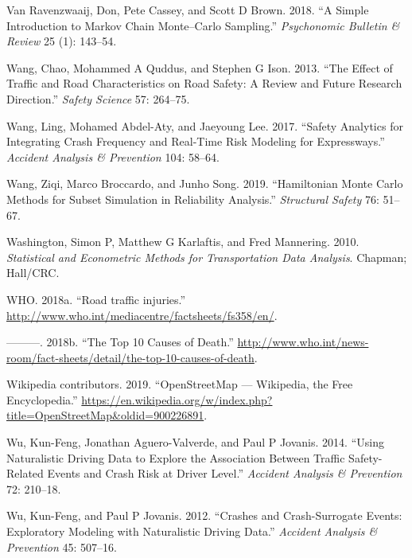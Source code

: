 \documentclass[12pt]{book}
\numberwithin{equation}{chapter}
\begin{document}
\leavevmode\hypertarget{ref-van2018simple}{}%
Van Ravenzwaaij, Don, Pete Cassey, and Scott D Brown. 2018. ``A Simple Introduction to Markov Chain Monte--Carlo Sampling.'' \emph{Psychonomic Bulletin \& Review} 25 (1): 143--54.

\leavevmode\hypertarget{ref-wang2013effect}{}%
Wang, Chao, Mohammed A Quddus, and Stephen G Ison. 2013. ``The Effect of Traffic and Road Characteristics on Road Safety: A Review and Future Research Direction.'' \emph{Safety Science} 57: 264--75.

\leavevmode\hypertarget{ref-wang2017safety}{}%
Wang, Ling, Mohamed Abdel-Aty, and Jaeyoung Lee. 2017. ``Safety Analytics for Integrating Crash Frequency and Real-Time Risk Modeling for Expressways.'' \emph{Accident Analysis \& Prevention} 104: 58--64.

\leavevmode\hypertarget{ref-wang2019hamiltonian}{}%
Wang, Ziqi, Marco Broccardo, and Junho Song. 2019. ``Hamiltonian Monte Carlo Methods for Subset Simulation in Reliability Analysis.'' \emph{Structural Safety} 76: 51--67.

\leavevmode\hypertarget{ref-washington2010statistical}{}%
Washington, Simon P, Matthew G Karlaftis, and Fred Mannering. 2010. \emph{Statistical and Econometric Methods for Transportation Data Analysis}. Chapman; Hall/CRC.

\leavevmode\hypertarget{ref-who2018b}{}%
WHO. 2018a. ``Road traffic injuries.'' \url{http://www.who.int/mediacentre/factsheets/fs358/en/}.

\leavevmode\hypertarget{ref-who2018}{}%
---------. 2018b. ``The Top 10 Causes of Death.'' \url{http://www.who.int/news-room/fact-sheets/detail/the-top-10-causes-of-death}.

\leavevmode\hypertarget{ref-wikiOSM}{}%
Wikipedia contributors. 2019. ``OpenStreetMap --- Wikipedia, the Free Encyclopedia.'' \url{https://en.wikipedia.org/w/index.php?title=OpenStreetMap\&oldid=900226891}.

\leavevmode\hypertarget{ref-wu2014using}{}%
Wu, Kun-Feng, Jonathan Aguero-Valverde, and Paul P Jovanis. 2014. ``Using Naturalistic Driving Data to Explore the Association Between Traffic Safety-Related Events and Crash Risk at Driver Level.'' \emph{Accident Analysis \& Prevention} 72: 210--18.

\leavevmode\hypertarget{ref-wu2012crashes}{}%
Wu, Kun-Feng, and Paul P Jovanis. 2012. ``Crashes and Crash-Surrogate Events: Exploratory Modeling with Naturalistic Driving Data.'' \emph{Accident Analysis \& Prevention} 45: 507--16.
\end{document}
